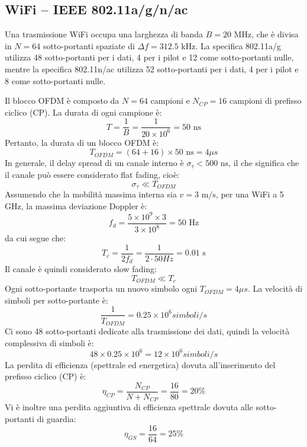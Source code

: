 

\subsection*{WiFi – IEEE 802.11a/g/n/ac}

Una trasmissione WiFi occupa una larghezza di banda \( B = 20 \text{ MHz} \), che è divisa in \( N = 64 \) sotto-portanti spaziate di \( \Delta f = 312.5 \text{ kHz} \). 
La specifica 802.11a/g utilizza 48 sotto-portanti per i dati, 4 per i pilot e 12 come sotto-portanti nulle, mentre la specifica 802.11n/ac utilizza 52 sotto-portanti per i dati, 4 per i pilot e 8 come sotto-portanti nulle.

Il blocco OFDM è composto da \( N = 64 \) campioni e \( N_{CP} = 16 \) campioni di prefisso ciclico (CP). La durata di ogni campione è:
\[
T = \frac{1}{B} = \frac{1}{20 \times 10^6} = 50 \text{ ns}
\]
Pertanto, la durata di un blocco OFDM è:
\[
    T_{OFDM} = (64 + 16) \times 50 \text{ ns} = 4 \si{\mu s}
\]
In generale, il delay spread di un canale interno è \( \sigma_\tau < 500 \text{ ns} \), il che significa che il canale può essere considerato flat fading, cioè:
\[
    \sigma_\tau \ll T_{OFDM}
\]
Assumendo che la mobilità massima interna sia \( v = 3 \text{ m/s} \), per una WiFi a 5 GHz, la massima deviazione Doppler è:
\[
f_d = \frac{5 \times 10^9 \times 3}{3 \times 10^8} = 50 \text{ Hz}
\]
da cui segue che:
\[
T_c = \frac{1}{2f_d} = \frac{1}{2\cdot 50\si{Hz}} = 0.01 \text{ s}
\]
Il canale è quindi considerato slow fading:
\[
T_{OFDM} \ll T_c
\]
Ogni sotto-portante trasporta un nuovo simbolo ogni \( T_{OFDM} = 4 \si{ \mu s} \). La velocità di simboli per sotto-portante è:
\[
\frac{1}{T_{OFDM}} = 0.25 \times 10^6 \si{ simboli/s}
\]
Ci sono 48 sotto-portanti dedicate alla trasmissione dei dati, quindi la velocità complessiva di simboli è:
\[
48 \times 0.25 \times 10^6 = 12 \times 10^6 \si{ simboli/s}
\]
La perdita di efficienza (spettrale ed energetica) dovuta all'inserimento del prefisso ciclico (CP) è:
\[
\eta_{CP} = \frac{N_{CP}}{N + N_{CP}} = \frac{16}{80} = 20\%
\]
Vi è inoltre una perdita aggiuntiva di efficienza spettrale dovuta alle sotto-portanti di guardia:
\[
\eta_{GS} = \frac{16}{64} = 25\%
\]
